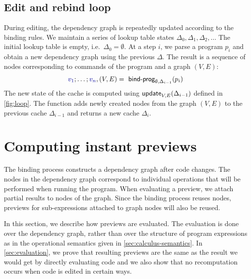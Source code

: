 \documentclass[english,crc,references=cleveref]{programming}
\theoremstyle{plain}
\theoremstyle{definition}
\newcommand{\ident}[1]{\textnormal{\textcolor{idclr}{\sffamily #1}}}
\newcommand{\bndclr}[1]{\textcolor{kvdclr}{#1}}
\begin{document}

\subsection{Edit and rebind loop}

During editing, the dependency graph is repeatedly updated according to the binding rules.
We maintain a series of lookup table states $\Delta_0, \Delta_1, \Delta_2, \ldots$ The initial
lookup table is empty, i.\hairspace e.~$\Delta_0 = \emptyset$. At a step $i$, we parse a program $p_i$
and obtain a new dependency graph using the previous $\Delta$. The result is
a sequence of nodes corresponding to commands of the program and a graph $(V, E)$:
%
\begin{equation*}
\bndclr{v_1}; \ldots; \bndclr{v_n}, (V, E) = \ident{bind-prog}_{\emptyset, \Delta_{i-1}}(p_i)
\end{equation*}
%
The new state of the cache is computed using $\ident{update}_{V, E}(\Delta_{i-1})$
defined in \cref{fig:loop}. The function adds newly created nodes from the graph
$(V, E)$ to the previous cache $\Delta_{i-1}$ and returns a new cache $\Delta_{i}$.


\section{Computing instant previews}
\label{sec:previews}

The binding process constructs a dependency graph after code changes. The nodes in the dependency
graph correspond to individual operations that will be performed when running the program. When
evaluating a preview, we attach partial results to nodes of the graph. Since the binding process
reuses nodes, previews for sub-expressions attached to graph nodes will also be reused.

In this section, we describe how previews are evaluated. The evaluation is done over the dependency
graph, rather than over the structure of program expressions as in the operational semantics
given in \cref{sec:calculus-semantics}. In \cref{sec:evaluation}, we prove that
resulting previews are the same as the result we would get by directly evaluating code and we
also show that no recomputation occurs when code is edited in certain ways.
\end{document}
